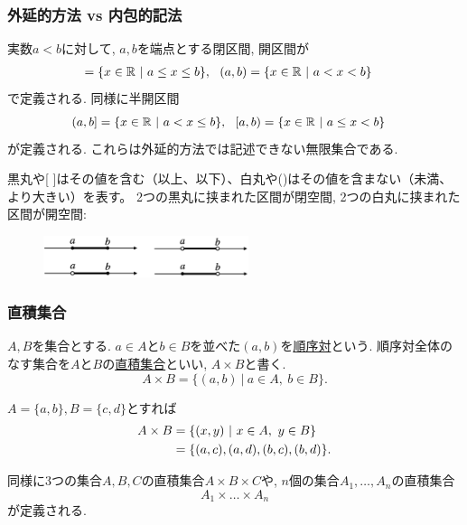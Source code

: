 \begin{frame}
\frametitle{外延的方法 vs 内包的記法}   

\begin{Ex}
実数$a<b$に対して, $a,b$を端点とする閉区間, 開区間が
\begin{align*}
[a,b] = \{x \in \R \ | \ a \le x \le b \}, \ \ (a,b) &=\{x \in \R \ | \ a < x < b \} 
\end{align*}
で定義される. 
同様に半開区間
\begin{align*}
(a,b] = \{x \in \R \ | \ a < x \le b \}, \ \ [a,b) &=\{x \in \R \ | \ a \le x < b \}
\end{align*}
が定義される. 
これらは外延的方法では記述できない無限集合である. 
\end{Ex}
黒丸や[ ]はその値を含む（以上、以下）、白丸や()はその値を含まない（未満、より大きい）を表す。
2つの黒丸に挟まれた区間が閉空間, 2つの白丸に挟まれた区間が開空間: 
 \begin{figure}[htbp]
 \begin{center} 
  \includegraphics[width=60mm]{calculus1/interval.png}
 \end{center}
\end{figure}

\end{frame}






\begin{frame}
\frametitle{直積集合}   

\begin{Def}[直積集合]
$A, B$を集合とする. 
$a \in A$と$b \in B$を並べた$(a,b)$を\underline{順序対}という. 
順序対全体のなす集合を$A$と$B$の\underline{直積集合}といい, $A \times B$と書く. 
$$
A \times B = \{(a,b) \ | \ a \in A, \ b \in B\}. 
$$
\end{Def}

$A=\{a,b\}, B=\{c,d\}$とすれば
\begin{align}
A\times B &= \{(x,y) \ | \ x \in A, \ y \in B \} \notag \\
&=\{(a,c), (a,d), (b,c), (b,d)\}.  \notag
\end{align}

同様に3つの集合$A,B,C$の直積集合$A \times B \times C$や, $n$個の集合$A_1,\dots,A_n$の直積集合
$$
A_1 \times \dots \times A_n
$$
が定義される. 



\end{frame}



